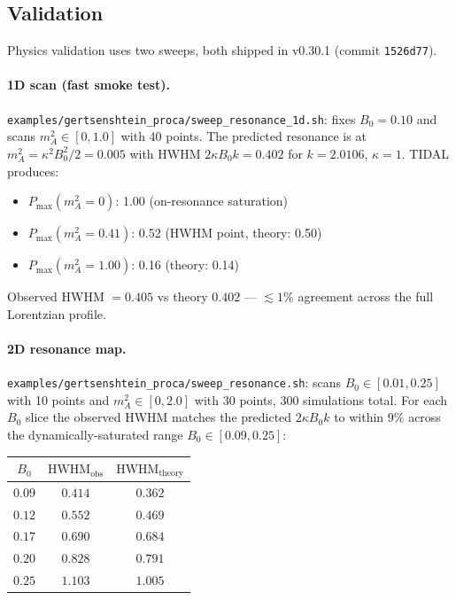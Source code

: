 \subsection{Validation}
\label{subsec:proca-validation}

Physics validation uses two sweeps, both shipped in v0.30.1 (commit
\texttt{1526d77}).

\paragraph{1D scan (fast smoke test).}
\texttt{examples/gertsenshtein\_proca/sweep\_resonance\_1d.sh}:
fixes $B_0 = 0.10$ and scans $m_A^2 \in [0, 1.0]$ with 40 points. The
predicted resonance is at $m_A^2 = \kappa^2 B_0^2 / 2 = 0.005$ with HWHM
$2\kappa B_0 k = 0.402$ for $k = 2.0106$, $\kappa = 1$. TIDAL produces:
\begin{itemize}
  \item $P_{\max}(m_A^2 = 0)$: 1.00 (on-resonance saturation)
  \item $P_{\max}(m_A^2 = 0.41)$: 0.52 (HWHM point, theory: 0.50)
  \item $P_{\max}(m_A^2 = 1.00)$: 0.16 (theory: 0.14)
\end{itemize}
Observed HWHM $= 0.405$ vs theory $0.402$ --- $\lesssim 1\%$ agreement
across the full Lorentzian profile.

\paragraph{2D resonance map.}
\texttt{examples/gertsenshtein\_proca/sweep\_resonance.sh}: scans
$B_0 \in [0.01, 0.25]$ with 10 points and $m_A^2 \in [0, 2.0]$ with 30
points, 300 simulations total. For each $B_0$ slice the observed HWHM
matches the predicted $2\kappa B_0 k$ to within $9\%$ across the
dynamically-saturated range $B_0 \in [0.09, 0.25]$:

\begin{center}
\begin{tabular}{ccc}
\toprule
$B_0$ & $\mathrm{HWHM}_{\mathrm{obs}}$ & $\mathrm{HWHM}_{\mathrm{theory}}$ \\
\midrule
$0.09$ & $0.414$ & $0.362$ \\
$0.12$ & $0.552$ & $0.469$ \\
$0.17$ & $0.690$ & $0.684$ \\
$0.20$ & $0.828$ & $0.791$ \\
$0.25$ & $1.103$ & $1.005$ \\
\bottomrule
\end{tabular}
\end{center}


